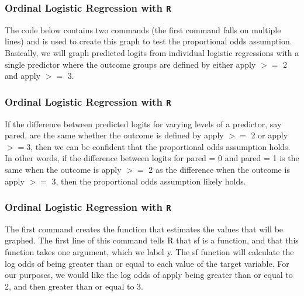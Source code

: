 \documentclass[00-GLMregslides.tex]{subfiles}
\begin{document}
\begin{frame}[fragile]
	
	\frametitle{Ordinal Logistic Regression with \texttt{R}}
	\Large
	The code below contains two commands (the first command falls on multiple lines) and is used to create this graph to test the proportional odds assumption. Basically, we will graph predicted logits from individual logistic regressions with a single predictor where the outcome groups are defined by either apply $>=$ 2 and apply $>=$ 3. 
	
\end{frame}

\begin{frame}[fragile]
	
	\frametitle{Ordinal Logistic Regression with \texttt{R}}
	\Large
	
	If the difference between predicted logits for varying levels of a predictor, say pared, are the same whether the outcome is defined by apply $>=$ 2 or apply $>=$3, then we can be confident that the proportional odds assumption holds. In other words, if the difference between logits for pared = 0 and pared = 1 is the same when the outcome is apply $>=$ 2 as the difference when the outcome is apply $>=$ 3, then the proportional odds assumption likely holds.
	
\end{frame}
\begin{frame}[fragile]
	
	\frametitle{Ordinal Logistic Regression with \texttt{R}}
	\Large
	The first command creates the function that estimates the values that will be graphed. The first line of this command tells R that sf is a function, and that this function takes one argument, which we label y. The sf function will calculate the log odds of being greater than or equal to each value of the target variable. For our purposes, we would like the log odds of apply being greater than or equal to 2, and then greater than or equal to 3. 
	
\end{frame}
\end{document}
